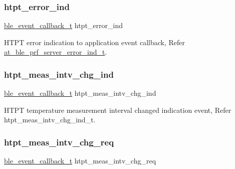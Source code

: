 \mbox{\label{structble__htpt__event__cb_abb98bb72becfe308ad6aa77782a09081}} 
\subsubsection{\texorpdfstring{htpt\_error\_ind}{htpt\_error\_ind}}
{\footnotesize\ttfamily \mbox{\hyperlink{ble__manager_8h_a04ce4bb8cb8282f2762e3924b1773cc9}{ble\+\_\+event\+\_\+callback\+\_\+t}} htpt\+\_\+error\+\_\+ind}



H\+T\+PT error indication to application event callback, Refer \mbox{\hyperlink{structat__ble__prf__server__error__ind__t}{at\+\_\+ble\+\_\+prf\+\_\+server\+\_\+error\+\_\+ind\+\_\+t}}. 

\mbox{\label{structble__htpt__event__cb_a9366e383df70598018d1a3c427cb7449}} 
\subsubsection{\texorpdfstring{htpt\_meas\_intv\_chg\_ind}{htpt\_meas\_intv\_chg\_ind}}
{\footnotesize\ttfamily \mbox{\hyperlink{ble__manager_8h_a04ce4bb8cb8282f2762e3924b1773cc9}{ble\+\_\+event\+\_\+callback\+\_\+t}} htpt\+\_\+meas\+\_\+intv\+\_\+chg\+\_\+ind}



H\+T\+PT temperature measurement interval changed indication event, Refer htpt\+\_\+meas\+\_\+intv\+\_\+chg\+\_\+ind\+\_\+t. 

\mbox{\label{structble__htpt__event__cb_aecb6eed49dbeab4e1d4a10df39937fc4}} 
\subsubsection{\texorpdfstring{htpt\_meas\_intv\_chg\_req}{htpt\_meas\_intv\_chg\_req}}
{\footnotesize\ttfamily \mbox{\hyperlink{ble__manager_8h_a04ce4bb8cb8282f2762e3924b1773cc9}{ble\+\_\+event\+\_\+callback\+\_\+t}} htpt\+\_\+meas\+\_\+intv\+\_\+chg\+\_\+req}



